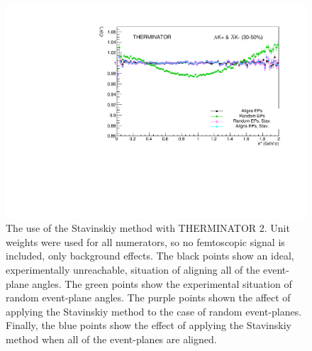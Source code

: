 \documentclass[/home/jesse/Analysis/FemtoAnalysis/AnalysisNotes/AnalysisNoteJBuxton.tex]{subfiles}
\begin{document}
\begin{figure}[h]
  \centering
  \includegraphics[width=\textwidth]{5_Fitting/Figures/CompareBackgroundReductionMethods_Full_LamKchPwConj_3050_NumWeight1.pdf}
  \caption[Background reduction methods with THERMINATOR]{The use of the Stavinskiy method with THERMINATOR 2.  Unit weights were used for all numerators, so no femtoscopic signal is included, only background effects.  The black points show an ideal, experimentally unreachable, situation of aligning all of the event-plane angles.  The green points show the experimental situation of random event-plane angles.  The purple points shown the affect of applying the Stavinskiy method to the case of random event-planes.  Finally, the blue points show the effect of applying the Stavinskiy method when all of the event-planes are aligned.}
  \label{fig:BgdRedMethodsTHERM}
\end{figure}
\end{document}
